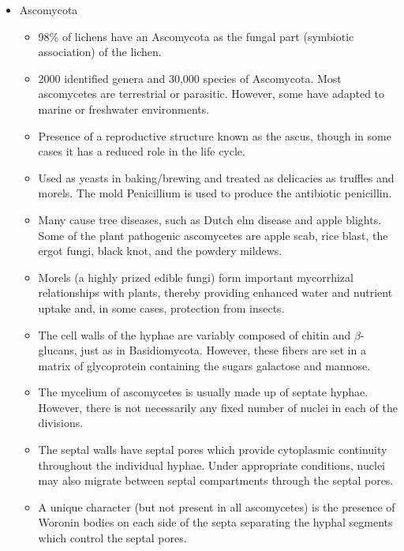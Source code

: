 \documentclass[10pt,dvipsnames,ignorenonframetext,aspectratio=169]{beamer}
\providecommand{\tightlist}{%
  \setlength{\itemsep}{0pt}\setlength{\parskip}{0pt}}
\begin{document}
\begin{frame}{}
\protect\hypertarget{section-6}{}
\begin{itemize}
\tightlist
\item
  Ascomycota

  \begin{itemize}
  \footnotesize
  \item 98\% of lichens have an Ascomycota as the fungal part (symbiotic association) of the lichen.
  \item 2000 identified genera and 30,000 species of Ascomycota. Most ascomycetes are terrestrial or parasitic. However, some have adapted to marine or freshwater environments.
  \item Presence of a reproductive structure known as the ascus, though in some cases it has a reduced role in the life cycle.
  \item Used as yeasts in baking/brewing and treated as delicacies as truffles and morels. The mold Penicillium is used to produce the antibiotic penicillin.
  \item Many cause tree diseases, such as Dutch elm disease and apple blights. Some of the plant pathogenic ascomycetes are apple scab, rice blast, the ergot fungi, black knot, and the powdery mildews.
  \item Morels (a highly prized edible fungi) form important mycorrhizal relationships with plants, thereby providing enhanced water and nutrient uptake and, in some cases, protection from insects.
  \item The cell walls of the hyphae are variably composed of chitin and $\beta$-glucans, just as in Basidiomycota. However, these fibers are set in a matrix of glycoprotein containing the sugars galactose and mannose.
  \item The mycelium of ascomycetes is usually made up of septate hyphae. However, there is not necessarily any fixed number of nuclei in each of the divisions.
  \item The septal walls have septal pores which provide cytoplasmic continuity throughout the individual hyphae. Under appropriate conditions, nuclei may also migrate between septal compartments through the septal pores.
  \item A unique character (but not present in all ascomycetes) is the presence of Woronin bodies on each side of the septa separating the hyphal segments which control the septal pores.
  \end{itemize}
\end{itemize}
\end{frame}
\end{document}

